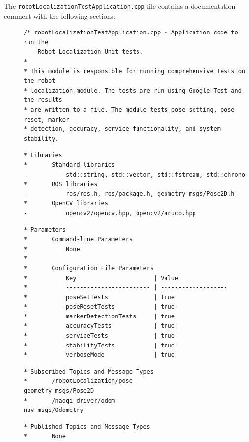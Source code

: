 \documentclass{CSSRforAfrica}
\newcommand{\checkboxChecked}{\fbox{\ding{51}}} %
\begin{document}
\noindent The {\small \verb+robotLocalizationTestApplication.cpp+} file contains a documentation comment with the following sections:

\begin{description}

\item[\checkboxChecked] 
{\small 
\begin{verbatim}
/* robotLocalizationTestApplication.cpp - Application code to run the
    Robot Localization Unit tests.
*
* This module is responsible for running comprehensive tests on the robot
* localization module. The tests are run using Google Test and the results
* are written to a file. The module tests pose setting, pose reset, marker
* detection, accuracy, service functionality, and system stability.
\end{verbatim}}

\item[\checkboxChecked] 
{\small 
\begin{verbatim}
* Libraries
*       Standard libraries
-           std::string, std::vector, std::fstream, std::chrono
*       ROS libraries
-           ros/ros.h, ros/package.h, geometry_msgs/Pose2D.h
*       OpenCV libraries
-           opencv2/opencv.hpp, opencv2/aruco.hpp
\end{verbatim}}

\item[\checkboxChecked] 
{\small 
\begin{verbatim}
* Parameters
*       Command-line Parameters
*           None
*           
*       Configuration File Parameters
*           Key                      | Value 
*           ------------------------ | -------------------
*           poseSetTests             | true
*           poseResetTests           | true
*           markerDetectionTests     | true
*           accuracyTests            | true
*           serviceTests             | true
*           stabilityTests           | true
*           verboseMode              | true
\end{verbatim}}

\item[\checkboxChecked] 
{\small 
\begin{verbatim}
* Subscribed Topics and Message Types
*       /robotLocalization/pose                 geometry_msgs/Pose2D
*       /naoqi_driver/odom                      nav_msgs/Odometry
\end{verbatim}}

\item[\checkboxChecked] 
{\small 
\begin{verbatim}                    
* Published Topics and Message Types
*       None
\end{verbatim}}


\end{description}
\end{document}
